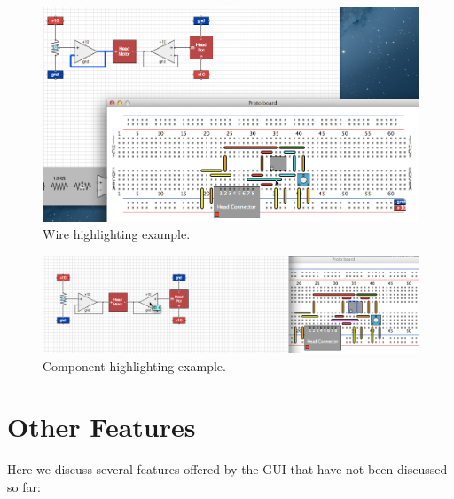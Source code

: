 \begin{figure}
\begin{center}
\includegraphics[width=\textwidth]{Images/gui_wire_highlight.png}
\caption{Wire highlighting example.}
\label{fig:wire_highlight}
\end{center}
\end{figure}

\begin{figure}
\begin{center}
\includegraphics[width=\textwidth]{Images/gui_component_highlight.png}
\caption{Component highlighting example.}
\label{fig:component_highlight}
\end{center}
\end{figure}

\section{Other Features}

Here we discuss several features offered by the GUI that have not been discussed
so far:

